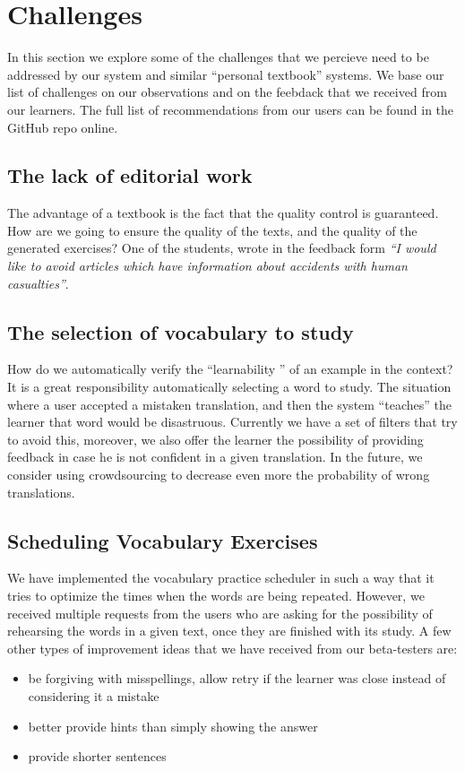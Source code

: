 \newpage
\section{Challenges}
\label{sec:challenges}

In this section we explore some of the challenges that we percieve need to be addressed by our system and similar ``personal textbook'' systems. We base our list of challenges on our observations and on the feebdack that we received from our learners. The full list of recommendations from our users can be found in the GitHub repo online.

\subsection{The lack of editorial work}
The advantage of a textbook is the fact that the quality control is guaranteed. How are we going to ensure the quality of the texts, and the quality of the generated exercises? One of the students, wrote in the feedback form {\em ``I would like to avoid articles which have information about accidents with human casualties''}.

\subsection{The selection of vocabulary to study}

How do we automatically verify the ``learnability '' of an example in the context? It is a great responsibility automatically selecting a word to study. The situation where a user accepted a mistaken translation, and then the system ``teaches'' the learner that word would be disastruous. Currently we have a set of filters that try to avoid this, moreover, we also offer the learner the possibility of providing feedback in case he is not confident in a given translation. In the future, we consider using crowdsourcing to decrease even more the probability of wrong translations.

\subsection{Scheduling Vocabulary Exercises}
We have implemented the vocabulary practice scheduler in such a way that it tries to optimize the times when the words are being repeated. However, we received multiple requests from the users who are asking for the possibility of rehearsing the words in a given text, once they are finished with its study. A few other types of improvement ideas that we have received from our beta-testers are: 
\begin{itemize}
	\item be forgiving with misspellings, allow retry if the learner was close instead of considering it a mistake
	\item better provide hints than simply showing the answer
	\item provide shorter sentences
\end{itemize}


